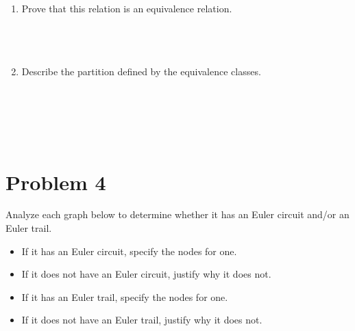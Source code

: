 \documentclass{amsart}
\theoremstyle{definition}
\theoremstyle{Exercise}
\theoremstyle{remark}
\theoremstyle{rule}
\numberwithin{equation}{section}
\begin{document}
  \begin{enumerate}[label=(\alph*)]
    \item Prove that this relation is an equivalence relation.
\\\\
\\\\
    \item Describe the partition defined by the equivalence classes.
\\\\
\\\\
  \end{enumerate}
\newpage
~\\
  \section*{Problem 4}
 Analyze each graph below to determine whether it has an Euler circuit and/or an Euler trail.
 \begin{itemize}
     \item If it has an Euler circuit, specify the nodes for one.
     \item If it does not have an Euler circuit, justify why it does not.
     \item If it has an Euler trail, specify the nodes for one.
     \item If it does not have an Euler trail, justify why it does not.
 \end{itemize}
\end{document}
